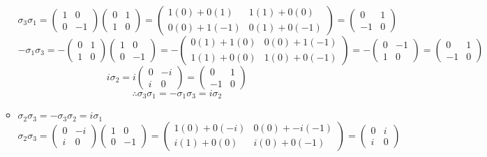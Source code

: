\begin{itemize}
\begin{itemize}
\[\sigma_3\sigma_1=\begin{pmatrix} 1 & 0 \\ 0 & -1\end{pmatrix} \begin{pmatrix} 0 & 1 \\ 1 & 0 \end{pmatrix}= \begin{pmatrix} 1(0)+0(1) & 1(1)+0(0)\\ 0(0)+1(-1) & 0(1)+0(-1)\end{pmatrix}=\begin{pmatrix} 0 & 1\\ -1 & 0\end{pmatrix}\]
 \[-\sigma_1\sigma_3= -\begin{pmatrix} 0 & 1\\ 1 & 0
\end{pmatrix} \begin{pmatrix} 1 & 0 \\ 0 & -1\end{pmatrix}= -\begin{pmatrix} 0(1)+1(0) & 0(0)+1(-1)\\ 1(1)+0(0) & 1(0)+0(-1)\end{pmatrix}=-\begin{pmatrix} 0 & -1 \\ 1 & 0 \end{pmatrix}=\begin{pmatrix} 0 & 1 \\ -1 & 0 \end{pmatrix}\]
\[i\sigma_2 =i \begin{pmatrix} 0 & -i \\ i & 0 \end{pmatrix}=\begin{pmatrix} 0 & 1 \\ -1 & 0 \end{pmatrix}\]
\[\therefore \sigma_3\sigma_1=-\sigma_1\sigma_3=i\sigma_2\]
    \item $\sigma_2\sigma_3=-\sigma_3\sigma_2=i\sigma_1$
\[\sigma_2\sigma_3=\begin{pmatrix} 0 & -i \\ i & 0 \end{pmatrix}  \begin{pmatrix} 1 & 0\\ 0 & -1
\end{pmatrix}= \begin{pmatrix} 1(0)+0(-i) & 0(0)+-i(-1)\\ i(1)+0(0) & i(0)+0(-1)\end{pmatrix}=\begin{pmatrix} 0 & i \\ i & 0 \end{pmatrix}\]

\end{itemize}
\end{itemize}
